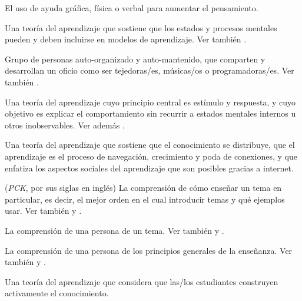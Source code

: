 \begin{description}
 El uso de ayuda gráfica,
física o verbal para aumentar el pensamiento.

 Una teoría del aprendizaje que sostiene que los estados 
y procesos mentales pueden y deben incluirse en modelos de aprendizaje. Ver también
.

 Grupo de personas auto-organizado y auto-mantenido,
que comparten y desarrollan un oficio como ser tejedoras/es, músicas/os o programadoras/es. Ver también
.

 Una teoría del aprendizaje cuyo principio central
es estímulo y respuesta, y cuyo objetivo es explicar el comportamiento sin recurrir
a estados mentales internos u otros inobservables. Ver
además .

 Una teoría del aprendizaje que sostiene que el conocimiento se distribuye,
que el aprendizaje es el proceso de navegación, crecimiento y poda de conexiones, y que enfatiza los aspectos
sociales del aprendizaje que son posibles gracias a internet.

 (\emph{PCK}, por sus siglas en inglés) 
La comprensión de cómo enseñar un tema en particular, es decir, el mejor orden en el cual introducir temas y qué ejemplos usar. 
Ver también 
y .

 La comprensión de una
persona de un tema. Ver también
y .

 La
comprensión de una persona de los principios generales de la enseñanza. Ver también
y .

 Una teoría del aprendizaje que considera que
las/los estudiantes construyen activamente el conocimiento.


\end{description}
